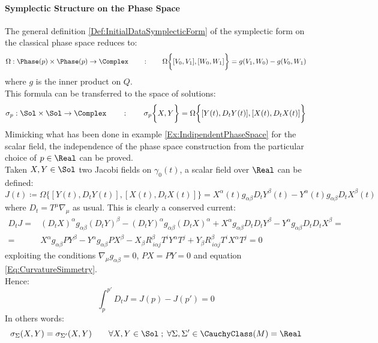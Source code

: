 \documentclass[Main]{subfiles}
\begin{document}
			\paragraph{Symplectic Structure on the Phase Space}		
				The general definition \ref{Def:InitialDataSymplecticForm} of the symplectic form on the classical phase space reduces to:
				\begin{displaymath}
					\Omega: \Phase(p) \times \Phase(p) \rightarrow \Complex \qquad : \qquad 					
					\Omega \biggr\{ [V_0,V_1] , [W_0, W_1] \biggr\} = g(V_1,W_0)  - g( V_0, W_1) 
				\end{displaymath}
				where $g$ is the inner product on $Q$.
				\\
				This formula can be transferred to the space of solutions:
				\begin{displaymath}
					\sigma_p: \Sol \times \Sol \rightarrow \Complex \qquad : \qquad 					
					\sigma_p \biggr\{X, Y  \biggr\} = \Omega \biggr\{ [Y(t), D_t Y(t)] , [X(t), D_t X(t)] \biggr\}
				\end{displaymath}
				\vspace{3mm}
				Mimicking what has been done in example \ref{Ex:IndipendentPhaseSpace} for the scalar field, the independence of the phase space construction from the particular choice of $p \in \Real$ can be proved.\\
				Taken $X,Y \in \Sol$ two Jacobi fields on $\gamma_0(t)$, a scalar field over $\Real$ can be defined:
				\begin{displaymath}
					J(t) \coloneqq \Omega \biggr\{ [Y(t), D_t Y(t)] , [X(t), D_t X(t)] \biggr\}
					= X^\alpha(t) g_{\alpha \beta} D_t Y^\beta(t) - 
					Y^\alpha(t) g_{\alpha \beta} D_t X^\beta(t) 					
				\end{displaymath}
				where $D_t = T^\mu \nabla_\mu$ as usual.
				This is clearly a conserved current:
				\begin{eqnarray}
					D_t J =& (D_t X)^\alpha g_{\alpha \beta} (D_t Y)^\beta - (D_t Y)^\alpha g_{\alpha \beta} (D_t X)^\alpha + X^\alpha g_{\alpha \beta} D_t D_t Y^\beta - Y^\alpha g_{\alpha \beta} D_t D_t X^\beta = \nonumber \\
					=& X^\alpha g_{\alpha \beta} PY^\beta - Y^\alpha g_{\alpha \beta} PX^\beta - X_\beta R^\beta _{\, i \alpha j}T^i Y^\alpha T^j +Y_\beta R^\beta _{\, i \alpha j}T^i X^\alpha T^j  = 0
				\end{eqnarray}
				exploiting the conditions $\nabla_\mu g_{\alpha \beta}=0$, $PX=PY=0$ and equation \ref{Eq:CurvatureSimmetry}.\\
				Hence:
				\begin{displaymath}
				\int_p^{p'} D_t J = J(p) - J(p') = 0
				\end{displaymath}
			In others words:
			\begin{displaymath}
				\sigma_\Sigma (X, Y) = \sigma_{\Sigma'} (X, Y) 
				\qquad \forall X, Y \in \Sol \; ; \; \forall \Sigma, \Sigma' \in \CauchyClass(M)= \Real
			\end{displaymath}
			
\end{document}
